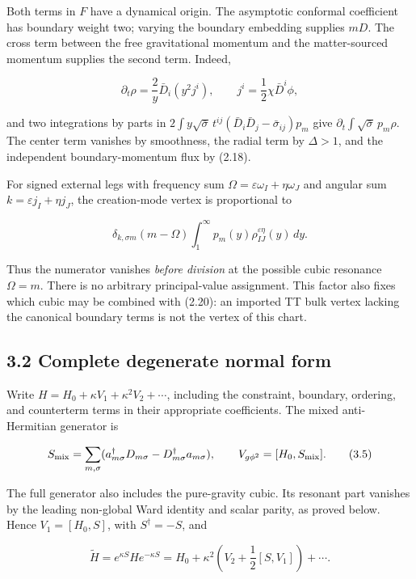 Both terms in \(F\) have a dynamical origin. The asymptotic conformal coefficient has boundary weight two; varying the boundary embedding supplies \(mD\). The cross term between the free gravitational momentum and the matter-sourced momentum supplies the second term. Indeed,

\[
\partial_t\rho=\frac2y\bar D_i(y^2j^i),
\qquad j^i=\frac12\chi\bar D^i\phi ,
\tag{3.3}
\]

and two integrations by parts in \(2\int y\sqrt{\bar\sigma}\,t^{ij}(\bar D_i\bar D_j-\bar\sigma_{ij})p_m\) give \(\partial_t\int\sqrt{\bar\sigma}\,p_m\rho\). The center term vanishes by smoothness, the radial term by \(\Delta>1\), and the independent boundary-momentum flux by (2.18).

For signed external legs with frequency sum \(\Omega=\varepsilon\omega_I+\eta\omega_J\) and angular sum \(k=\varepsilon j_I+\eta j_J\), the creation-mode vertex is proportional to

\[
\delta_{k,\sigma m}(m-\Omega)
\int_1^\infty p_m(y)\rho_{IJ}^{\varepsilon\eta}(y)\,dy .
\tag{3.4}
\]

Thus the numerator vanishes \emph{before division} at the possible cubic resonance \(\Omega=m\). There is no arbitrary principal-value assignment. This factor also fixes which cubic may be combined with (2.20): an imported TT bulk vertex lacking the canonical boundary terms is not the vertex of this chart.

\hypertarget{complete-degenerate-normal-form}{%
\subsection{3.2 Complete degenerate normal form}\label{complete-degenerate-normal-form}}

Write \(H=H_0+\kappa V_1+\kappa^2V_2+\cdots\), including the constraint, boundary, ordering, and counterterm terms in their appropriate coefficients. The mixed anti-Hermitian generator is

\[
S_{\rm mix}=\sum_{m,\sigma}
(a^\dagger_{m\sigma}D_{m\sigma}
-D^\dagger_{m\sigma}a_{m\sigma}),
\qquad V_{g\phi^2}=[H_0,S_{\rm mix}].
\tag{3.5}
\]

The full generator also includes the pure-gravity cubic. Its resonant part vanishes by the leading non-global Ward identity and scalar parity, as proved below. Hence \(V_1=[H_0,S]\), with \(S^\dagger=-S\), and

\[
\widetilde H=e^{\kappa S}He^{-\kappa S}
=H_0+\kappa^2\left(V_2+\frac12[S,V_1]\right)+\cdots .
\tag{3.6}
\]

